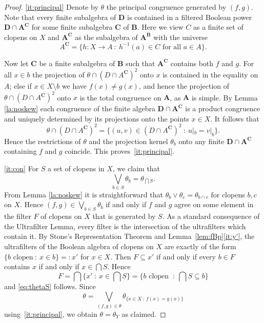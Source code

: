 \documentclass[12pt,a4paper,reqno]{amsart}
\numberwithin{equation}{section}
\theoremstyle{plain}
\theoremstyle{definition}
\newcommand{\A}{\mathbf{A}}
\newcommand{\B}{\mathbf{B}}
\newcommand{\C}{\mathbf{C}}
\newcommand{\D}{\mathbf{D}}
\newcommand{\st}{\: :\:}
\begin{document}
\begin{proof}
\eqref{it:principal}
 Denote by $\theta$ the principal congruence generated by $(f,g)$.
 Note that every finite subalgebra of $\D$ is contained in a filtered Boolean power $\D\cap \A^\C$ for some finite subalgebra
 $\C$ of $\B$. Here we view $C$ as a finite set of clopens on $X$ and $\A^\C$ as the subalgebra of $\A^\B$ with the universe
\[ A^\C = \{h\colon X\to A \st h^{-1}(a) \in C \text{ for all } a\in A\}. \]

Now let $\C$ be a finite subalgebra of $\B$ such that $\A^\C$ contains both $f$ and $g$.
 For all $x\in b$ the projection of $\theta\cap (D\cap A^\C)^2$ onto $x$ is contained in the equality on $A$;
 else if $x\in X\setminus b$ we have $f(x)\neq g(x)$, and hence the projection of $\theta\cap (D\cap A^\C)^2$ onto $x$
 is the total congruence on $\A$, as $\A$ is simple.
 By Lemma \ref{la:noskew} each congruence of the finite algebra $\D\cap \A^\C$ is a product congruence
 and uniquely determined by its projections onto the points $x\in X$. It follows that
 \[  \theta \cap (D\cap A^\C)^2  = \{ (u,v)\in (D\cap A^\C)^2 \st u|_b  = v|_b \}. \]
 Hence the restrictions of $\theta$ and the projection kernel $\theta_{b}$ onto any finite $\D\cap\A^\C$
 containing $f$ and $g$ coincide.
 This proves~\eqref{it:principal}.


\eqref{it:con}  
 For $S$ a set of clopens in $X$, we claim that 
 \begin{equation}  \label{eq:thetaS}
   \bigvee_{b\in S} \theta_b = \theta_{\bigcap S}.
 \end{equation} 
 From Lemma \ref{la:noskew} it is straightforward that $\theta_b \vee \theta_c = \theta_{b\cap c}$ for clopens $b,c$ on $X$.
 Hence $(f,g)\in \bigvee_{b\in S} \theta_b$ if and only if $f$ and $g$ agree on some element in the filter $F$ of clopens
 on $X$ that is generated by $S$.
 As a standard consequence of the Ultrafilter Lemma, every filter is the intersection of the ultrafilters which contain it.
 By Stone's Representation Theorem and Lemma~\ref{lem:fBp}\eqref{it:y'},
 the ultrafilters of the Boolean algebra of clopens on $X$ are exactly of the form
 $\{ b \text{ clopen} \st x\in b \} =: x'$ for $x\in X$.
 Then $F \subseteq x'$ if and only if every $b\in F$ contains $x$ if and only if $x\in\bigcap S$.
 Hence
\[
 F = \bigcap \{ x' \st x\in\bigcap S \} = \{ b \text{ clopen } \st \bigcap S \subseteq b \}
\]
and \eqref{eq:thetaS} follows. Since
\[ \theta = \bigvee_{(f,g)\in\theta} \theta_{\{ x\in X \st f(x)=g(x) \}} \]
using~\eqref{it:principal}, we obtain $\theta = \theta_Y$ as claimed.
\end{proof}
\end{document}
